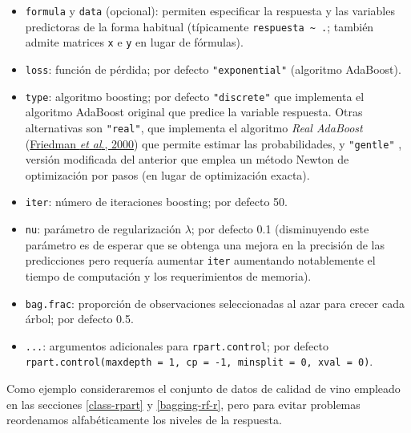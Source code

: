 \documentclass[
]{book}
\theoremstyle{break}
\theoremstyle{definition}
\theoremstyle{definition}
\theoremstyle{definition}
\theoremstyle{definition}
\theoremstyle{remark}
\begin{document}
\begin{itemize}
\item
  \texttt{formula} y \texttt{data} (opcional): permiten especificar la respuesta y las variables predictoras de la forma habitual (típicamente \texttt{respuesta\ \textasciitilde{}\ .}; también admite matrices \texttt{x} e \texttt{y} en lugar de fórmulas).
\item
  \texttt{loss}: función de pérdida; por defecto \texttt{"exponential"} (algoritmo AdaBoost).
\item
  \texttt{type}: algoritmo boosting; por defecto \texttt{"discrete"} que implementa el algoritmo AdaBoost original que predice la variable respuesta. Otras alternativas son \texttt{"real"}, que implementa el algoritmo \emph{Real AdaBoost} (\href{https://projecteuclid.org/euclid.aos/1016218223}{Friedman \emph{et al}., 2000}) que permite estimar las probabilidades, y \texttt{"gentle"} , versión modificada del anterior que emplea un método Newton de optimización por pasos (en lugar de optimización exacta).
\item
  \texttt{iter}: número de iteraciones boosting; por defecto 50.
\item
  \texttt{nu}: parámetro de regularización \(\lambda\); por defecto 0.1 (disminuyendo este parámetro es de esperar que se obtenga una mejora en la precisión de las predicciones pero requería aumentar \texttt{iter} aumentando notablemente el tiempo de computación y los requerimientos de memoria).
\item
  \texttt{bag.frac}: proporción de observaciones seleccionadas al azar para crecer cada árbol; por defecto 0.5.
\item
  \texttt{...}: argumentos adicionales para \texttt{rpart.control}; por defecto \texttt{rpart.control(maxdepth\ =\ 1,\ cp\ =\ -1,\ minsplit\ =\ 0,\ xval\ =\ 0)}.
\end{itemize}

Como ejemplo consideraremos el conjunto de datos de calidad de vino empleado en las secciones \ref{class-rpart} y \ref{bagging-rf-r}, pero para evitar problemas reordenamos alfabéticamente los niveles de la respuesta.
\end{document}
